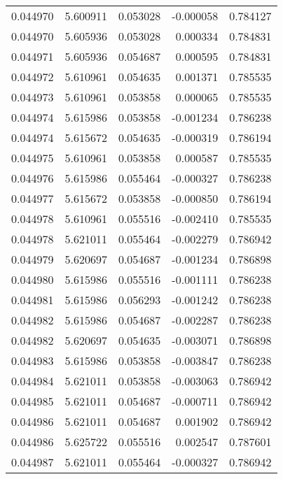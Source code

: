 \begin{tabular}{lrrrr}
0.044970    &  5.600911 &  0.053028 & -0.000058 &             0.784127 \\
0.044970    &  5.605936 &  0.053028 &  0.000334 &             0.784831 \\
0.044971    &  5.605936 &  0.054687 &  0.000595 &             0.784831 \\
0.044972    &  5.610961 &  0.054635 &  0.001371 &             0.785535 \\
0.044973    &  5.610961 &  0.053858 &  0.000065 &             0.785535 \\
0.044974    &  5.615986 &  0.053858 & -0.001234 &             0.786238 \\
0.044974    &  5.615672 &  0.054635 & -0.000319 &             0.786194 \\
0.044975    &  5.610961 &  0.053858 &  0.000587 &             0.785535 \\
0.044976    &  5.615986 &  0.055464 & -0.000327 &             0.786238 \\
0.044977    &  5.615672 &  0.053858 & -0.000850 &             0.786194 \\
0.044978    &  5.610961 &  0.055516 & -0.002410 &             0.785535 \\
0.044978    &  5.621011 &  0.055464 & -0.002279 &             0.786942 \\
0.044979    &  5.620697 &  0.054687 & -0.001234 &             0.786898 \\
0.044980    &  5.615986 &  0.055516 & -0.001111 &             0.786238 \\
0.044981    &  5.615986 &  0.056293 & -0.001242 &             0.786238 \\
0.044982    &  5.615986 &  0.054687 & -0.002287 &             0.786238 \\
0.044982    &  5.620697 &  0.054635 & -0.003071 &             0.786898 \\
0.044983    &  5.615986 &  0.053858 & -0.003847 &             0.786238 \\
0.044984    &  5.621011 &  0.053858 & -0.003063 &             0.786942 \\
0.044985    &  5.621011 &  0.054687 & -0.000711 &             0.786942 \\
0.044986    &  5.621011 &  0.054687 &  0.001902 &             0.786942 \\
0.044986    &  5.625722 &  0.055516 &  0.002547 &             0.787601 \\
0.044987    &  5.621011 &  0.055464 & -0.000327 &             0.786942 \\

\end{tabular}
